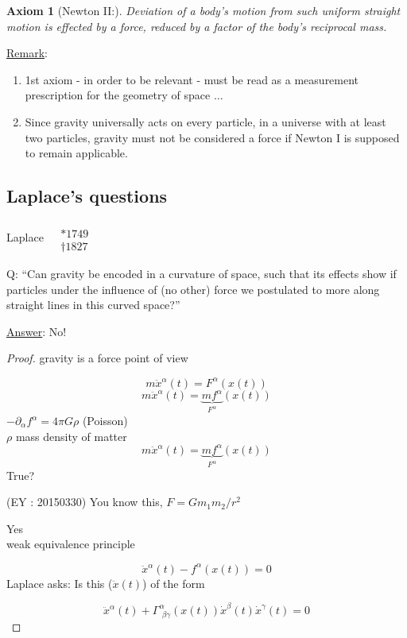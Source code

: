 \documentclass[10pt, twoside]{amsart}
\newtheorem{axiom}{Axiom}
\begin{document}
\begin{multicols*}{2}
\begin{axiom}[Newton II:]
Deviation of a body's motion from such uniform straight motion is effected by a force, reduced by a factor of the body's reciprocal mass.  
\end{axiom}

\underline{Remark}: \begin{enumerate}
\item[(1)] 1st axiom - in order to be relevant - must be read as a measurement prescription for the geometry of space $\dots $
\item[(2)] Since gravity universally acts on every particle, in a universe with at least two particles, gravity must not be considered a force if Newton I is supposed to remain applicable.  
\end{enumerate}

\subsection{Laplace's questions} Laplace $\begin{aligned}  & \quad \\ 
  & * 1749 \\
  & \dag 1827  \end{aligned}$

Q: ``Can gravity be encoded in a curvature of space, such that its effects show if particles under the influence of (no other) force we postulated to more along straight lines in this curved space?''

\underline{Answer}: No!

\begin{proof}
gravity is a force point of view


\[
m \ddot{x}^{\alpha}(t) = F^{\alpha}(x(t))
\]
\[
m\ddot{x}^{\alpha}(t) = \underbrace{mf^{\alpha}}_{F^{\alpha}}(x(t))
\]
$-\partial_{\alpha} f^{\alpha} = 4\pi G\rho$ (Poisson) \\
$\rho $ mass density of matter
\[
m \ddot{x}^{\alpha}(t)= \underbrace{mf^{\alpha}}_{F^{\alpha}}(x(t))
\]
True?

(EY : 20150330) You know this, $F=Gm_1m_2/r^2$

Yes \\ 
weak equivalence principle

\[
\ddot{x}^{\alpha}(t) - f^{\alpha}(x(t)) = 0 
\]
Laplace asks: Is this ($\ddot{x}(t)$) of the form 

\[
\ddot{x}^{\alpha}(t) + \Gamma^{\alpha}_{\, \, \beta \gamma}(x(t)) \dot{x}^{\beta}(t) \dot{x}^{\gamma}(t) = 0 
\]


\end{proof}
\end{multicols*}
\end{document}
